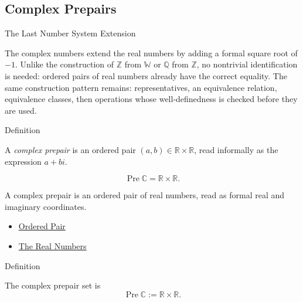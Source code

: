 \subsection*{Complex Prepairs}

\begin{topicbox}{The Last Number System Extension}
\begin{exposition}
The complex numbers extend the real numbers by adding a formal square root of
$-1$. Unlike the construction of $\mathbb{Z}$ from $\mathbb{W}$ or
$\mathbb{Q}$ from $\mathbb{Z}$, no nontrivial identification is needed:
ordered pairs of real numbers already have the correct equality. The same
construction pattern remains: representatives, an equivalence relation,
equivalence classes, then operations whose well-definedness is checked before
they are used.
\end{exposition}
\end{topicbox}

\begin{definitionbox}{Definition}
\begin{definition}
\label{def:complex-prepair}
A \emph{complex prepair} is an ordered pair $(a,b)\in\mathbb{R}\times\mathbb{R}$,
read informally as the expression $a+bi$.
\end{definition}
\end{definitionbox}


\begin{remark*}
\[
\operatorname{Pre}\mathbb{C}=\mathbb{R}\times\mathbb{R}.
\]
\end{remark*}

\begin{remark*}[Interpretation]
A complex prepair is an ordered pair of real numbers, read as formal real and
imaginary coordinates.
\end{remark*}

\begin{dependencies}
\begin{itemize}
  \item \hyperref[def:ordered-pair]{Ordered Pair}
  \item \hyperref[def:reals]{The Real Numbers}
\end{itemize}
\end{dependencies}

\begin{definitionbox}{Definition}
\begin{definition}
\label{def:complex-prepair-set}
The complex prepair set is
\[
\operatorname{Pre}\mathbb{C}:=\mathbb{R}\times\mathbb{R}.
\]
\end{definition}
\end{definitionbox}

